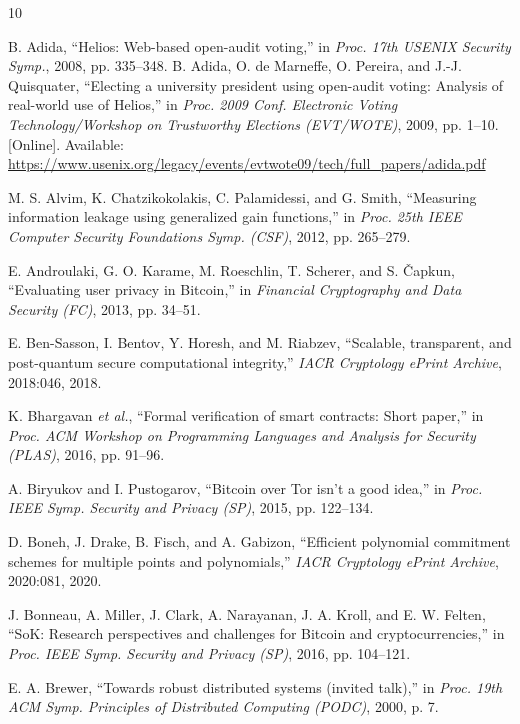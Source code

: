 \documentclass{ieeeaccess}
\begin{document}
\begin{thebibliography}{10}

B. Adida, ``Helios: Web-based open-audit voting,'' in \emph{Proc. 17th USENIX Security Symp.}, 2008, pp. 335--348.
B. Adida, O. de Marneffe, O. Pereira, and J.-J. Quisquater, ``Electing a university president using open-audit voting: Analysis of real-world use of Helios,'' in \emph{Proc. 2009 Conf. Electronic Voting Technology/Workshop on Trustworthy Elections (EVT/WOTE)}, 2009, pp. 1--10. [Online]. Available: \url{https://www.usenix.org/legacy/events/evtwote09/tech/full_papers/adida.pdf}

M. S. Alvim, K. Chatzikokolakis, C. Palamidessi, and G. Smith, ``Measuring information leakage using generalized gain functions,'' in \emph{Proc. 25th IEEE Computer Security Foundations Symp. (CSF)}, 2012, pp. 265--279.

E. Androulaki, G. O. Karame, M. Roeschlin, T. Scherer, and S. Čapkun, ``Evaluating user privacy in Bitcoin,'' in \emph{Financial Cryptography and Data Security (FC)}, 2013, pp. 34--51.

E. Ben-Sasson, I. Bentov, Y. Horesh, and M. Riabzev, ``Scalable, transparent, and post-quantum secure computational integrity,'' \emph{IACR Cryptology ePrint Archive}, 2018:046, 2018.

K. Bhargavan \emph{et al.}, ``Formal verification of smart contracts: Short paper,'' in \emph{Proc. ACM Workshop on Programming Languages and Analysis for Security (PLAS)}, 2016, pp. 91--96.

A. Biryukov and I. Pustogarov, ``Bitcoin over Tor isn't a good idea,'' in \emph{Proc. IEEE Symp. Security and Privacy (SP)}, 2015, pp. 122--134.

D. Boneh, J. Drake, B. Fisch, and A. Gabizon, ``Efficient polynomial commitment schemes for multiple points and polynomials,'' \emph{IACR Cryptology ePrint Archive}, 2020:081, 2020.

J. Bonneau, A. Miller, J. Clark, A. Narayanan, J. A. Kroll, and E. W. Felten, ``SoK: Research perspectives and challenges for Bitcoin and cryptocurrencies,'' in \emph{Proc. IEEE Symp. Security and Privacy (SP)}, 2016, pp. 104--121.

E. A. Brewer, ``Towards robust distributed systems (invited talk),'' in \emph{Proc. 19th ACM Symp. Principles of Distributed Computing (PODC)}, 2000, p. 7.


\end{thebibliography}
\end{document}
